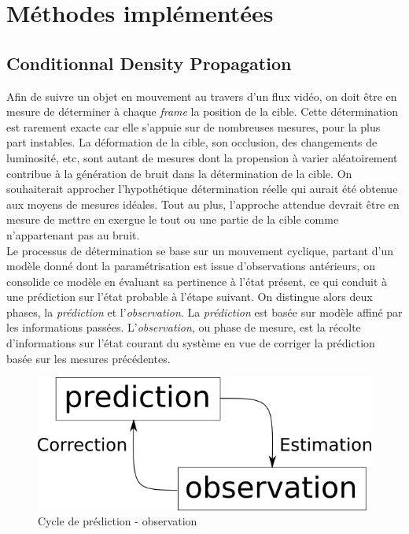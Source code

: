 \documentclass[a4paper,12pt]{report}
\begin{document}
\chapter{Méthodes implémentées}

\section{Conditionnal Density Propagation}
Afin de suivre un objet en mouvement au travers d'un flux vidéo, on doit être en mesure de déterminer à chaque \textit{frame} la position de la cible. 
Cette détermination est rarement exacte car elle s'appuie sur de nombreuses mesures, pour la plus part instables. 
La déformation de la cible, son occlusion, des changements de luminosité, etc, sont autant de mesures dont la propension à varier aléatoirement contribue à la génération de bruit dans la détermination de la cible.
On souhaiterait approcher l'hypothétique détermination réelle qui aurait été obtenue aux moyens de mesures idéales. Tout au plus, l'approche attendue devrait être en mesure de mettre en exergue le tout ou une partie de la cible comme n'appartenant pas au bruit.\\
Le processus de détermination se base sur un mouvement cyclique, partant d'un modèle donné dont la paramétrisation est issue d'observations antérieurs, on consolide ce modèle en évaluant sa pertinence à l'état présent, ce qui conduit à une prédiction sur l'état probable à l'étape suivant. 
On distingue alors deux phases, la \textit{prédiction} et l'\textit{observation}. La \textit{prédiction} est basée sur modèle affiné par les informations passées. L'\textit{observation}, ou phase de mesure, est la récolte d'informations sur l'état courant du système en vue de corriger la prédiction basée sur les mesures précédentes.\\
\begin{figure}[hbtp]
\centering
\includegraphics[scale=0.5]{figurePredictionObservationCycle.png}
\caption{Cycle de prédiction - observation}
\end{figure}
\end{document}
